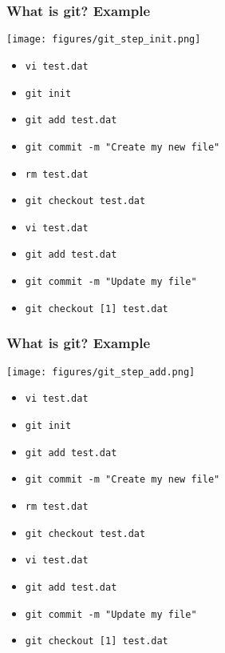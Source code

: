 \documentclass[xcolor=dvipsnames,10pt]{beamer}
\begin{document}
\addtocounter{framenumber}{-1}
\begin{frame}
 \frametitle{What is git? Example}
 
 \begin{center}
  \texttt{[image: figures/git\_step\_init.png]}
 \end{center}
 \vspace*{-0.5cm}
 
 \begin{itemize}
  \color{gray}
  \item[] \texttt{vi test.dat}
  \color{black}
  \item   \texttt{git init}
  \color{white}
  \item[] \texttt{git add test.dat}
  \item[] \texttt{git commit -m "Create my new file"}
  \item[] \texttt{rm test.dat}
  \item[] \texttt{git checkout test.dat}
  \item[] \texttt{vi test.dat}
  \item[] \texttt{git add test.dat}
  \item[] \texttt{git commit -m "Update my file"}
  \item[] \texttt{git checkout [1] test.dat}
 \end{itemize}


\end{frame}
\addtocounter{framenumber}{-1}
\begin{frame}
 \frametitle{What is git? Example}
 
 \begin{center}
  \texttt{[image: figures/git\_step\_add.png]}
 \end{center}
 \vspace*{-0.5cm}
 
 \begin{itemize}
  \color{gray}
  \item[] \texttt{vi test.dat}
  \item[] \texttt{git init}
  \color{black}
  \item   \texttt{git add test.dat}
  \color{white}
  \item[] \texttt{git commit -m "Create my new file"}
  \item[] \texttt{rm test.dat}
  \item[] \texttt{git checkout test.dat}
  \item[] \texttt{vi test.dat}
  \item[] \texttt{git add test.dat}
  \item[] \texttt{git commit -m "Update my file"}
  \item[] \texttt{git checkout [1] test.dat}
 \end{itemize}


\end{frame}
\end{document}
